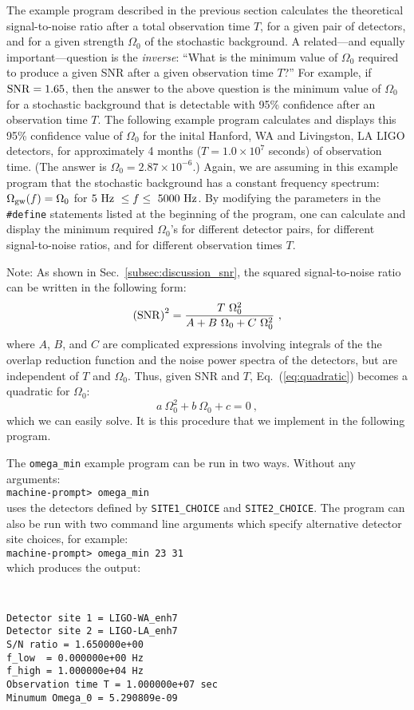 The example program described in the previous section calculates 
the theoretical signal-to-noise ratio after a total observation 
time $T$, for a given pair of detectors, and for a given strength 
$\Omega_0$ of the stochastic background.
A related---and equally important---question is the {\it inverse}:
``What is the minimum value of $\Omega_0$ required to produce a given 
SNR after a given observation time $T$?''
For example, if ${\rm SNR}=1.65$, then the answer to the above question 
is the minimum value of $\Omega_0$ for a stochastic background that is
detectable with 95\% confidence after an observation time $T$.
The following example program calculates and displays
this 95\% confidence value of $\Omega_0$ for the inital Hanford, WA and 
Livingston, LA LIGO detectors, for approximately
4 months ($T=1.0\times 10^7$ seconds) of observation time.
(The answer is $\Omega_0=2.87\times 10^{-6}$.)
Again, we are assuming in this example program that the stochastic 
background has a constant frequency spectrum:
$\Omega_{\rm gw}(f)=\Omega_0$ for $5\ {\rm Hz}\ \le f\le\ 5000\ {\rm Hz}$.
By modifying the parameters in the {\tt \#define} 
statements listed at the beginning of the program, one can calculate and 
display the minimum required $\Omega_0$'s for different detector pairs, 
for different signal-to-noise ratios, and for different observation times $T$.

Note: As shown in Sec.~\ref{subsec:discussion_snr}, the squared 
signal-to-noise ratio can be written in the following form:
%
\begin{equation}
\left({\rm SNR}\right)^2={T\ \Omega_0^2\over 
A + B\ \Omega_0 + C\ \Omega_0^2}\ ,
\label{eq:quadratic}
\end{equation}
%
where $A$, $B$, and $C$ are complicated expressions involving integrals 
of the the overlap reduction function and the noise power spectra of the 
detectors, but are independent of $T$ and $\Omega_0$.
Thus, given SNR and $T$, Eq.~(\ref{eq:quadratic}) becomes a quadratic for 
$\Omega_0$:
%
\begin{equation}
a\ \Omega_0^2 + b\ \Omega_0 + c = 0\ ,
\end{equation}
%
which we can easily solve.
It is this procedure that we implement in the following program.

The {\tt omega\_min} example program can be run in two ways.  Without any
arguments:\\
{\tt machine-prompt> omega\_min}\\
uses the detectors defined by {\tt SITE1\_CHOICE} and {\tt SITE2\_CHOICE}.
The program can also be run with two command line arguments which specify
alternative detector site choices, for example:\\
{\tt machine-prompt> omega\_min 23 31}\\
which produces the output:
{\tt
\begin{verbatim}
Detector site 1 = LIGO-WA_enh7
Detector site 2 = LIGO-LA_enh7
S/N ratio = 1.650000e+00
f_low  = 0.000000e+00 Hz
f_high = 1.000000e+04 Hz
Observation time T = 1.000000e+07 sec
Minumum Omega_0 = 5.290809e-09
\end{verbatim}
}

